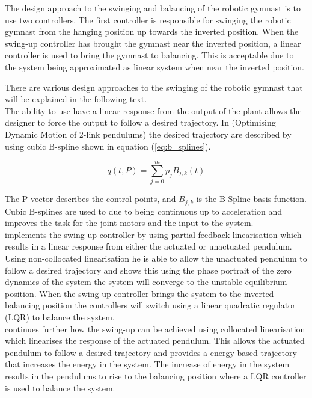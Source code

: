 The design approach to the swinging and balancing of the robotic gymnast is to use two controllers. The first controller is responsible for swinging the robotic gymnast from the hanging position up towards the inverted position. When the swing-up controller has brought the gymnast near the inverted position, a linear controller is used to bring the gymnast to balancing. This is acceptable due to the system being approximated as  linear system when near the inverted position.

There are various design approaches to the swinging of the robotic gymnast that will be explained in the following text.\\

The ability to use have a linear response from the output of the plant allows the designer to force the output to follow a desired trajectory. In (Optimising Dynamic Motion of 2-link pendulums) the desired trajectory are described by using cubic B-spline shown in equation (\ref{eq:b_splines}).

\begin{equation}
\label{eq:b_splines}
	q(t,P)  = \sum_{j=0}^{m}p_{j}B_{j,k}(t)
\end{equation}

The P vector describes the control points, and $B_{j,k}$ is the B-Spline basis function. Cubic B-splines are used to due to being continuous up to acceleration and improves the task for the joint motors and the input to the system.\\


\citet{spong_swingup} implements the swing-up controller by using partial feedback linearisation which results in a linear response from either the actuated or unactuated pendulum. Using non-collocated linearisation he is able to allow the unactuated pendulum to follow a desired trajectory and shows this using the phase portrait of the zero dynamics of the system the system will converge to the unstable equilibrium position. When the swing-up controller brings the system to the inverted balancing position the controllers will switch using a linear quadratic regulator (LQR) to balance the system.\\

\citet{spong_swingup} continues further how the swing-up can be achieved using collocated linearisation which linearises the response of the actuated pendulum. This allows the actuated pendulum to follow a desired trajectory and \citet{spong_swingup} provides a energy based trajectory that increases the energy in the system. The increase of energy in the system results in the pendulums to rise to the balancing position where a LQR controller is used to balance the system.\\

